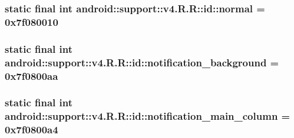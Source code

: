 \hypertarget{classandroid_1_1support_1_1v4_1_1_r_1_1id_98d161f592186738c9d5d69f1b7e88ae}{
\subsubsection[{normal}]{\setlength{\rightskip}{0pt plus 5cm}static final int android::support::v4.R.R::id::normal = 0x7f080010}}
\label{classandroid_1_1support_1_1v4_1_1_r_1_1id_98d161f592186738c9d5d69f1b7e88ae}


\hypertarget{classandroid_1_1support_1_1v4_1_1_r_1_1id_be30cc9755509441b6df3abd144e3ad5}{
\subsubsection[{notification\_\-background}]{\setlength{\rightskip}{0pt plus 5cm}static final int android::support::v4.R.R::id::notification\_\-background = 0x7f0800aa}}
\label{classandroid_1_1support_1_1v4_1_1_r_1_1id_be30cc9755509441b6df3abd144e3ad5}


\hypertarget{classandroid_1_1support_1_1v4_1_1_r_1_1id_28b4075b9f63951ff5047d6151ab2c34}{
\subsubsection[{notification\_\-main\_\-column}]{\setlength{\rightskip}{0pt plus 5cm}static final int android::support::v4.R.R::id::notification\_\-main\_\-column = 0x7f0800a4}}
\label{classandroid_1_1support_1_1v4_1_1_r_1_1id_28b4075b9f63951ff5047d6151ab2c34}


